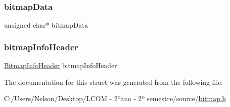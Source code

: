 \subsubsection{\texorpdfstring{bitmap\+Data}{bitmapData}}
{\footnotesize\ttfamily unsigned char$\ast$ bitmap\+Data}

\mbox{\label{struct_bitmap_a7157ca7f3ce4be47481c472fafd89313}} 
\subsubsection{\texorpdfstring{bitmap\+Info\+Header}{bitmapInfoHeader}}
{\footnotesize\ttfamily \hyperlink{struct_bitmap_info_header}{Bitmap\+Info\+Header} bitmap\+Info\+Header}



The documentation for this struct was generated from the following file\+:\begin{DoxyCompactItemize}
\item 
C\+:/\+Users/\+Nelson/\+Desktop/\+L\+C\+O\+M -\/ 2ºano -\/ 2º semestre/source/\hyperlink{bitmap_8h}{bitmap.\+h}\end{DoxyCompactItemize}
